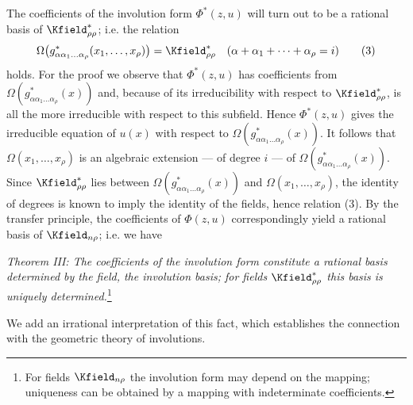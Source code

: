 \documentclass[11pt]{article}
\begin{document}
The coefficients of the involution form $\Phi^*(z,u)$ will turn out to be a rational basis of $\Kfield^*_{\rho\rho}$; i.e. the relation
\begin{equation}
  \Omega\bigl(g^*_{\alpha\alpha_1\ldots\alpha_\rho}(x_1,
  \ldots,x_\rho)\bigr)=\Kfield^*_{\rho\rho}
  \quad(\alpha+\alpha_1+\cdots+\alpha_\rho=i)
\tag{3}
\end{equation}
holds. For the proof we observe that $\Phi^*(z,u)$ has coefficients from $\Omega(g^*_{\alpha\alpha_1\ldots\alpha_\rho}(x))$ and, because of its irreducibility with respect to $\Kfield^*_{\rho\rho}$, is all the more irreducible with respect to this subfield. Hence $\Phi^*(z,u)$ gives the irreducible equation of $u(x)$ with respect to $\Omega(g^*_{\alpha\alpha_1\ldots\alpha_\rho}(x))$. It follows that $\Omega(x_1,
\ldots,x_\rho)$ is an algebraic extension --- of degree $i$ --- of $\Omega(g^*_{\alpha\alpha_1\ldots\alpha_\rho}(x))$. Since $\Kfield^*_{\rho\rho}$ lies between $\Omega(g^*_{\alpha\alpha_1\ldots\alpha_\rho}(x))$ and $\Omega(x_1,
\ldots,x_\rho)$, the identity of degrees is known to imply the identity of the fields, hence relation (3). By the transfer principle, the coefficients of $\Phi(z,u)$ correspondingly yield a rational basis of $\Kfield_{n\rho}$; i.e. we have

\emph{Theorem III: The coefficients of the involution form constitute a rational basis determined by the field, the involution basis; for fields $\Kfield^*_{\rho\rho}$ this basis is uniquely determined.}\footnote{For fields $\Kfield_{n\rho}$ the involution form may depend on the mapping; uniqueness can be obtained by a mapping with indeterminate coefficients.}

We add an irrational interpretation of this fact, which establishes the connection with the geometric theory of involutions.
\end{document}
